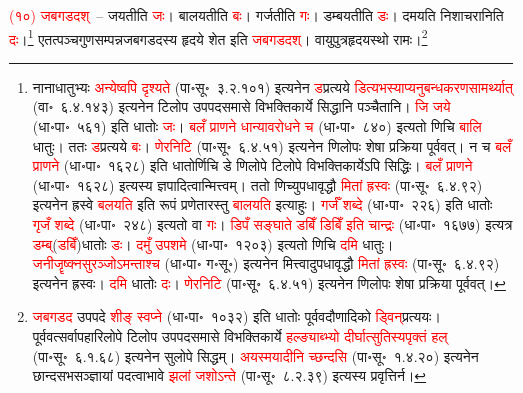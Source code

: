 \begin{sloppypar}\justifying\noindent\hspace{10mm} \textcolor{red}{(१०) जबगडदश्}~– जयतीति \textcolor{red}{जः}। बालयतीति \textcolor{red}{बः}। गर्जतीति \textcolor{red}{गः}। डम्बयतीति \textcolor{red}{डः}। दमयति निशाचरानिति \textcolor{red}{दः}।\footnote{नाना\-धातुभ्यः \textcolor{red}{अन्येष्वपि दृश्यते} (पा॰सू॰~३.२.१०१) इत्यनेन \textcolor{red}{ड}\-प्रत्यये \textcolor{red}{डित्यभस्याप्यनु\-बन्धकरण\-सामर्थ्यात्} (वा॰~६.४.१४३) इत्यनेन टिलोप उपपदसमासे विभक्तिकार्ये सिद्धानि पञ्चैतानि। \textcolor{red}{जि जये} (धा॰पा॰~५६१) इति धातोः \textcolor{red}{जः}। \textcolor{red}{बलँ प्राणने धान्यावरोधने च} (धा॰पा॰~८४०) इत्यतो णिचि \textcolor{red}{बालि} धातुः। ततः \textcolor{red}{ड}\-प्रत्यये \textcolor{red}{बः}। \textcolor{red}{णेरनिटि} (पा॰सू॰~६.४.५१) इत्यनेन णिलोपः शेषा प्रक्रिया पूर्ववत्। न च \textcolor{red}{बलँ प्राणने} (धा॰पा॰~१६२८) इति धातोर्णिचि डे णिलोपे टिलोपे विभक्तिकार्येऽपि सिद्धिः। \textcolor{red}{बलँ प्राणने} (धा॰पा॰~१६२८) इत्यस्य ज्ञपादित्वान्मित्त्वम्। ततो णिच्युपधा\-वृद्धौ \textcolor{red}{मितां ह्रस्वः} (पा॰सू॰~६.४.९२) इत्यनेन ह्रस्वे \textcolor{red}{बलयति} इति रूपं प्रणेतारस्तु \textcolor{red}{बालयति} इत्याहुः। \textcolor{red}{गर्जँ शब्दे} (धा॰पा॰~२२६) इति धातोः \textcolor{red}{गृजँ शब्दे} (धा॰पा॰~२४८) इत्यतो वा \textcolor{red}{गः}। \textcolor{red}{डिपँ सङ्घाते डबिँ डिबिँ इति चान्द्रः} (धा॰पा॰~१६७७) इत्यत्र \textcolor{red}{डम्ब्‌}\-(\textcolor{red}{डबिँ})\-धातोः \textcolor{red}{डः}। \textcolor{red}{दमुँ उपशमे} (धा॰पा॰~१२०३) इत्यतो णिचि \textcolor{red}{दमि} धातुः। \textcolor{red}{जनी\-जॄष्क्नसु\-रञ्जोऽमन्ताश्च} (धा॰पा॰ ग॰सू॰) इत्यनेन मित्त्वादुपधा\-वृद्धौ \textcolor{red}{मितां ह्रस्वः} (पा॰सू॰~६.४.९२) इत्यनेन ह्रस्वः। \textcolor{red}{दमि} धातोः \textcolor{red}{दः}। \textcolor{red}{णेरनिटि} (पा॰सू॰~६.४.५१) इत्यनेन णिलोपः शेषा प्रक्रिया पूर्ववत्।} एतत्पञ्च\-गुण\-सम्पन्न\-जबगडदस्य हृदये शेत इति \textcolor{red}{जबगडदश्}। वायु\-पुत्र\-हृदयस्थो रामः।\footnote{\textcolor{red}{जबगडद} उपपदे \textcolor{red}{शीङ् स्वप्ने} (धा॰पा॰~१०३२) इति धातोः पूर्ववदौणादिको \textcolor{red}{ड्विन्‌}\-प्रत्ययः। पूर्ववत्सर्वापहारि\-लोपे टिलोप उपपद\-समासे विभक्ति\-कार्ये \textcolor{red}{हल्ङ्याब्भ्यो दीर्घात्सुतिस्यपृक्तं हल्} (पा॰सू॰~६.१.६८) इत्यनेन सुलोपे सिद्धम्। \textcolor{red}{अयस्मयादीनि च्छन्दसि} (पा॰सू॰~१.४.२०) इत्यनेन छान्दस\-भसञ्ज्ञायां पदत्वाभावे \textcolor{red}{झलां जशोऽन्ते} (पा॰सू॰~८.२.३९) इत्यस्य प्रवृत्तिर्न।}\end{sloppypar}
